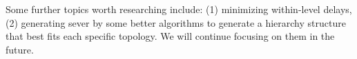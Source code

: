 \documentclass[conference]{IEEEtran}
\begin{document}
Some further topics worth researching include: (1) minimizing within-level delays, (2) generating sever by some better algorithms to generate a hierarchy structure that best fits each specific topology. We will continue focusing on them in the future.

%
%



%
%




\end{document}
